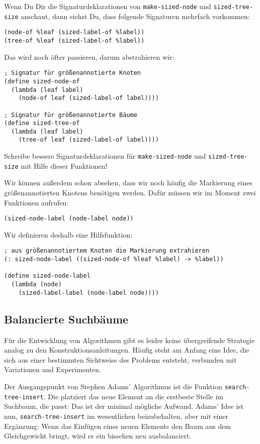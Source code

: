 %
Wenn Du Dir die Signaturdeklarationen von \lstinline{make-sized-node}
und \lstinline{sized-tree-size} anschaut, dann siehst Du, dass
folgende Signaturen mehrfach vorkommen:
%
\begin{lstlisting}
(node-of %leaf (sized-label-of %label))
(tree-of %leaf (sized-label-of %label))
\end{lstlisting}
%
Das wird noch öfter passieren, darum abstrahieren wir:
%
\begin{lstlisting}
; Signatur für größenannotierte Knoten
(define sized-node-of
  (lambda (leaf label)
    (node-of leaf (sized-label-of label))))

; Signatur für größenannotierte Bäume
(define sized-tree-of
  (lambda (leaf label)
    (tree-of leaf (sized-label-of label))))
\end{lstlisting}
%
\begin{aufgabeinline}
  Schreibe bessere Signaturdeklarationen für
  \lstinline{make-sized-node} und \lstinline{sized-tree-size} mit
  Hilfe dieser Funktionen!
\end{aufgabeinline}
%
Wir können außerdem schon absehen, dass wir noch häufig die Markierung
eines größenannotierten Knotens benötigen werden.  Dafür müssen wir im
Moment zwei Funktionen aufrufen:
%
\begin{lstlisting}
(sized-node-label (node-label node))
\end{lstlisting}
%
Wir definieren deshalb eine Hilfsfunktion:
%
\begin{lstlisting}
; aus größenannotiertem Knoten die Markierung extrahieren
(: sized-node-label ((sized-node-of %leaf %label) -> %label))

(define sized-node-label
  (lambda (node)
    (sized-label-label (node-label node))))
\end{lstlisting}

\subsection{Balancierte Suchbäume}
\label{sec:balanced-search-trees}

Für die Entwicklung von Algorithmen gibt es leider keine übergreifende
Strategie analog zu den Konstruktionsanleitungen. Häufig steht am
Anfang eine Idee, die sich aus einer bestimmten Sichtweise des
Problems entsteht, verbunden mit Variationen und Experimenten.

Der Ausgangspunkt von Stephen Adams' Algorithmus ist die Funktion
\lstinline{search-tree-insert}.  Die platziert das neue Element an die
erstbeste Stelle im Suchbaum, die passt: Das ist der minimal mögliche
Aufwand.  Adams' Idee ist nun, \lstinline{search-tree-insert} im
wesentlichen beizubehalten, aber mit einer Ergänzung: Wenn das
Einfügen eines neuen Elements den Baum aus dem Gleichgewicht bringt,
wird er ein bisschen neu ausbalanciert.

